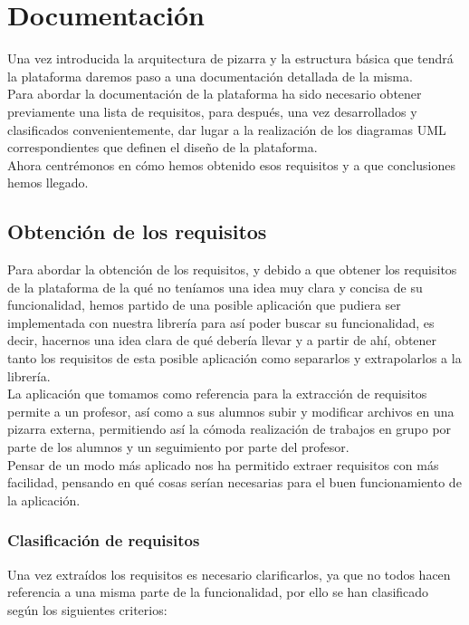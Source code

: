 \chapter{Documentación}
\lettrine[lines=1,slope=4pt,findent=0pt]{U}{}na vez introducida la arquitectura de pizarra y la estructura básica que tendrá la plataforma daremos paso a una documentación detallada de la misma.\\

Para abordar la documentación de la plataforma ha sido necesario obtener previamente una lista de requisitos, para después, una vez desarrollados y clasificados convenientemente, dar lugar a la realización de los diagramas UML correspondientes que definen el diseño de la plataforma.\\

Ahora centrémonos en cómo hemos obtenido esos requisitos y a que conclusiones hemos llegado.

\section{Obtención de los requisitos}
Para abordar la obtención de los requisitos, y debido a que obtener los requisitos de la plataforma de la qué no teníamos una idea muy clara y concisa de su funcionalidad, hemos partido de una posible aplicación que pudiera ser implementada con nuestra librería para así poder buscar su funcionalidad, es decir, hacernos una idea clara de qué debería llevar y a partir de ahí, obtener tanto los requisitos de esta posible aplicación como separarlos y extrapolarlos a la librería.\\

La aplicación que tomamos como referencia para la extracción de requisitos permite a un profesor, así como a sus alumnos subir y modificar archivos en una pizarra externa, permitiendo así la cómoda realización de trabajos en grupo por parte de los alumnos y un seguimiento por parte del profesor.\\

Pensar de un modo más aplicado nos ha permitido extraer requisitos con más facilidad, pensando en qué cosas serían necesarias para el buen funcionamiento de la aplicación.\\

\subsection{Clasificación de requisitos}
Una vez extraídos los requisitos es necesario clarificarlos, ya que no todos hacen referencia a una misma parte de la funcionalidad, por ello se han clasificado según los siguientes criterios:


